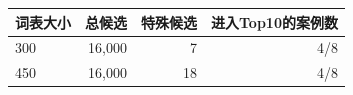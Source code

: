 \begin{tabular*}{\linewidth}{@{\extracolsep{\fill}}lrrr@{}}\toprule
词表大小 & 总候选 & 特殊候选 & 进入Top10的案例数\\\midrule
300 & 16,000 & 7 & 4/8\\
450 & 16,000 & 18 & 4/8\\
\bottomrule\end{tabular*}